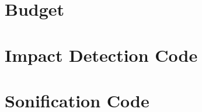 \documentclass[a4paper, 11pt, twoside] {report}
\begin{document}
	\chapter{Budget}
	
	\cleardoublepage

	\printbibliography
	\cleardoublepage

	\appendix

	\chapter{Impact Detection Code}
	
	\cleardoublepage

	\chapter{Sonification Code}
\end{document}
